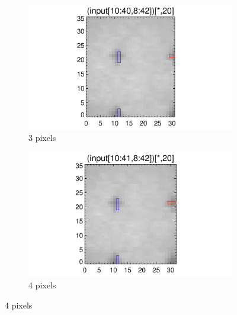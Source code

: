 \documentclass[10pt]{article}
\begin{document}
\begin{figure}[!h]
   \begin{subfigure}[b]{.45\linewidth}
        \centering
        \includegraphics[width=1.3\textwidth]{../plots_tables_images/fidcheck_withbothtruncate2.png}
        \caption{3 pixels}
    \end{subfigure}
    \begin{subfigure}[b]{.45\linewidth}
        \centering
        \includegraphics[width=1.3\textwidth]{../plots_tables_images/fidcheck_withbothtruncate3.png}
        \caption{4 pixels}
    \end{subfigure}


\end{figure}
\end{document}
